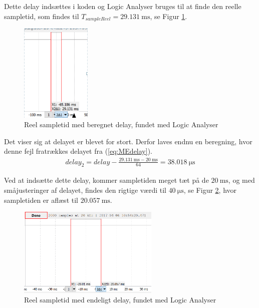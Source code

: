 Dette delay indsættes i koden og Logic Analyser bruges til at finde den reelle sampletid, som findes til $T_{sampleReel} = \SI{29,131}{\milli\second}$, se Figur \ref{fig:MEsampleTest1}.

\begin{figure}[htbp] %
	\centering
	\includegraphics[width=0.3\textwidth]{Figure/MEtestSample1}
	\caption{Reel sampletid med beregnet delay, fundet med Logic Analyser}
	\label{fig:MEsampleTest1}
\end{figure}

Det viser sig at delayet er blevet for stort. Derfor laves endnu en beregning, hvor denne fejl fratrækkes delayet fra (\ref{eq:MEdelay}).
\begin{align}
delay_2 = delay - \frac{\SI{29.131}{\milli\second}-\SI{20}{\milli\second}}{64} = \SI{38,018} {\micro\second}
\end{align}

Ved at indsætte dette delay, kommer sampletiden meget tæt på de $\SI{20}{\milli\second}$, og med småjusteringer af delayet, findes den rigtige værdi til $\SI{40}{\micro\second}$, se Figur \ref{fig:MEsampleTest2}, hvor sampletiden er aflæst til $\SI{20,057}{\milli\second}$.

\begin{figure}[H] %
	\centering
	\includegraphics[width=0.6\textwidth]{Figure/MEtestSample2}
	\caption{Reel sampletid med endeligt delay, fundet med Logic Analyser}
	\label{fig:MEsampleTest2}
\end{figure}



